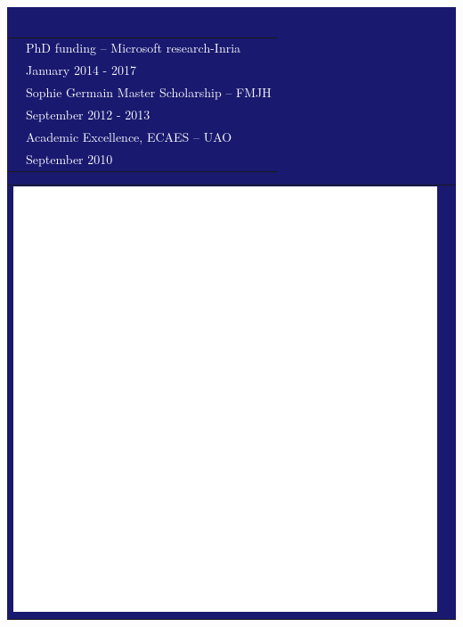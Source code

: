 \documentclass[letterpaper]{article}
\begin{document}
\begin{minipage}{1\linewidth}
\vspace{5ex}
\colorbox{MidnightBlue}{
\begin{minipage}{0.47\linewidth} %
	\begin{minipage}{1\linewidth}
		\begin{minipage}{1\linewidth}
			\\
			\vspace{2ex}
		\end{minipage}
		\textcolor{white}{
		\begin{minipage}{1\linewidth}
			\begin{tabularx}{1\textwidth}{rX}
				& {\normalsize PhD funding -- Microsoft 
				research-Inria}\\			
				\vspace{1ex}								
				& {\small \textcolor{gray!40}{January 2014 - 2017}}\\			
				& {\normalsize Sophie Germain Master Scholarship -- FMJH}\\
				\vspace{1ex}				
				& {\small \textcolor{gray!40}{September 2012 - 2013}}\\
				& {\normalsize Academic Excellence, ECAES -- UAO}\\
				& {\small \textcolor{gray!40}{September 2010}}\\				
			\end{tabularx}
		\end{minipage}
		}
		\vspace{2ex}
	\end{minipage}
	\begin{minipage}{1\linewidth}
		\vspace{2ex}
	\end{minipage}
	\begin{minipage}{0.3\linewidth}
		\vspace{1ex}
		\begin{tabularx}{1\textwidth}{rr}
			\includegraphics[width=0.15\linewidth]{pencil.eps} & 

\end{tabularx}
\end{minipage}
\end{minipage}}
\end{minipage}
\end{document}
